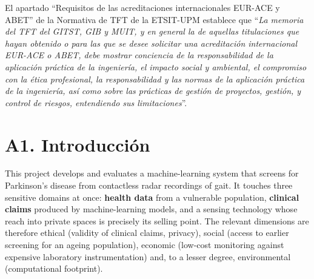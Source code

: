\normalsize{El apartado ``Requisitos de las acreditaciones internacionales EUR-ACE y ABET'' de la Normativa de TFT de la ETSIT-UPM establece que ``\textit{La memoria del TFT del GITST, GIB y MUIT, y en general la de aquellas titulaciones que hayan obtenido o para las que se desee solicitar una acreditación internacional EUR-ACE o ABET, debe mostrar conciencia de la responsabilidad de la aplicación práctica de la ingeniería, el impacto social y ambiental, el compromiso con la ética profesional, la responsabilidad y las normas de la aplicación práctica de la ingeniería, así como sobre las prácticas de gestión de proyectos, gestión, y control de riesgos, entendiendo sus limitaciones}''.}
\vspace{0.1cm}

\section*{A1. Introducci\'on}
\normalsize{This project develops and evaluates a machine-learning system
that screens for Parkinson's disease from contactless radar recordings of
gait. It touches three sensitive domains at once: \textbf{health data} from
a vulnerable population, \textbf{clinical claims} produced by
machine-learning models, and a sensing technology whose reach into private
spaces is precisely its selling point. The relevant dimensions are
therefore ethical (validity of clinical claims, privacy), social (access to
earlier screening for an ageing population), economic (low-cost monitoring
against expensive laboratory instrumentation) and, to a lesser degree,
environmental (computational footprint).}
\vspace{0.3cm}

